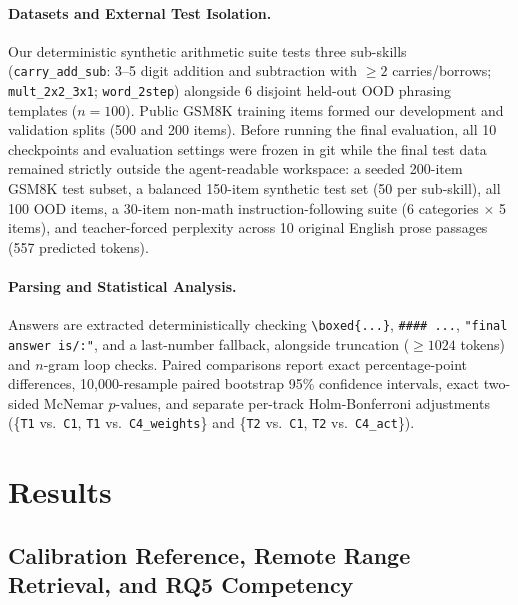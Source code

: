 \documentclass[11pt]{article}
\begin{document}
\paragraph{Datasets and External Test Isolation.}
Our deterministic synthetic arithmetic suite tests three sub-skills (\texttt{carry\_add\_sub}: 3--5 digit addition and subtraction with $\ge 2$ carries/borrows; \texttt{mult\_2x2\_3x1}; \texttt{word\_2step}) alongside 6 disjoint held-out OOD phrasing templates ($n=100$). Public GSM8K training items formed our development and validation splits (500 and 200 items). Before running the final evaluation, all 10 checkpoints and evaluation settings were frozen in git while the final test data remained strictly outside the agent-readable workspace: a seeded 200-item GSM8K test subset, a balanced 150-item synthetic test set (50 per sub-skill), all 100 OOD items, a 30-item non-math instruction-following suite (6 categories $\times$ 5 items), and teacher-forced perplexity across 10 original English prose passages (557 predicted tokens).

\paragraph{Parsing and Statistical Analysis.}
Answers are extracted deterministically checking \verb|\boxed{...}|, \texttt{\#\#\#\# ...}, \texttt{"final answer is/:"}, and a last-number fallback, alongside truncation ($\ge 1024$ tokens) and $n$-gram loop checks. Paired comparisons report exact percentage-point differences, 10,000-resample paired bootstrap 95\% confidence intervals, exact two-sided McNemar $p$-values, and separate per-track Holm-Bonferroni adjustments (\{\texttt{T1} vs.\ \texttt{C1}, \texttt{T1} vs.\ \texttt{C4\_weights}\} and \{\texttt{T2} vs.\ \texttt{C1}, \texttt{T2} vs.\ \texttt{C4\_act}\}).

\section{Results}

\subsection{Calibration Reference, Remote Range Retrieval, and RQ5 Competency}
\end{document}
